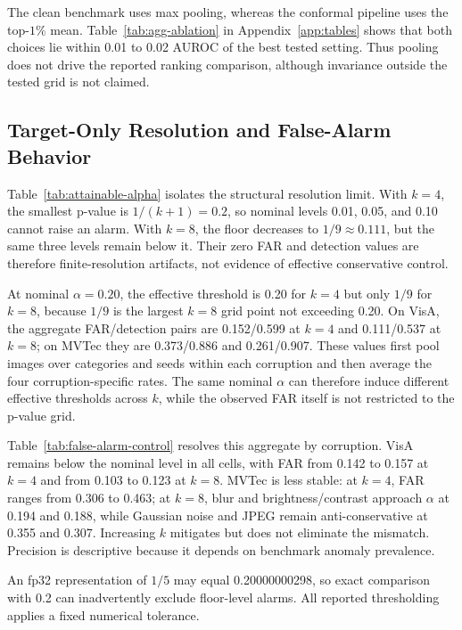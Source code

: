The clean benchmark uses max pooling, whereas the conformal pipeline uses the top-$1\%$ mean. Table~\ref{tab:agg-ablation} in Appendix~\ref{app:tables} shows that both choices lie within 0.01 to 0.02 AUROC of the best tested setting. Thus pooling does not drive the reported ranking comparison, although invariance outside the tested grid is not claimed.

\subsection{Target-Only Resolution and False-Alarm Behavior}\label{sec:target-only-operation}



Table~\ref{tab:attainable-alpha} isolates the structural resolution limit. With $k=4$, the smallest p-value is $1/(k+1)=0.2$, so nominal levels 0.01, 0.05, and 0.10 cannot raise an alarm. With $k=8$, the floor decreases to $1/9\approx0.111$, but the same three levels remain below it. Their zero FAR and detection values are therefore finite-resolution artifacts, not evidence of effective conservative control.

At nominal $\alpha=0.20$, the effective threshold is 0.20 for $k=4$ but only $1/9$ for $k=8$, because $1/9$ is the largest $k=8$ grid point not exceeding 0.20. On VisA, the aggregate FAR/detection pairs are 0.152/0.599 at $k=4$ and 0.111/0.537 at $k=8$; on MVTec they are 0.373/0.886 and 0.261/0.907. These values first pool images over categories and seeds within each corruption and then average the four corruption-specific rates. The same nominal $\alpha$ can therefore induce different effective thresholds across $k$, while the observed FAR itself is not restricted to the p-value grid.

Table~\ref{tab:false-alarm-control} resolves this aggregate by corruption. VisA remains below the nominal level in all cells, with FAR from 0.142 to 0.157 at $k=4$ and from 0.103 to 0.123 at $k=8$. MVTec is less stable: at $k=4$, FAR ranges from 0.306 to 0.463; at $k=8$, blur and brightness/contrast approach $\alpha$ at 0.194 and 0.188, while Gaussian noise and JPEG remain anti-conservative at 0.355 and 0.307. Increasing $k$ mitigates but does not eliminate the mismatch. Precision is descriptive because it depends on benchmark anomaly prevalence.

An fp32 representation of $1/5$ may equal 0.20000000298, so exact comparison with 0.2 can inadvertently exclude floor-level alarms. All reported thresholding applies a fixed numerical tolerance.

